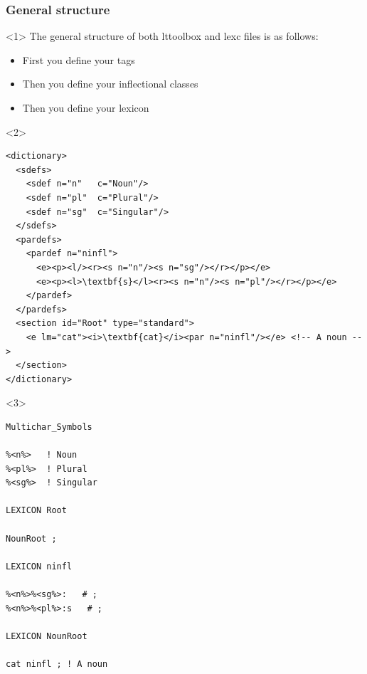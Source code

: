 \documentclass[10pt,xetex]{beamer} %
\begin{document}
\begin{frame}[fragile]
  \frametitle{General structure}

\begin{onlyenv}<1>
The general structure of both lttoolbox and lexc files is as follows:

\begin{itemize}

  \item First you define your tags

  \item Then you define your inflectional classes

  \item Then you define your lexicon

\end{itemize}
\end{onlyenv}

\begin{onlyenv}<2>
    \begin{verbatim}
<dictionary>
  <sdefs>
    <sdef n="n"   c="Noun"/>
    <sdef n="pl"  c="Plural"/>
    <sdef n="sg"  c="Singular"/>
  </sdefs>
  <pardefs>
    <pardef n="ninfl">
      <e><p><l/><r><s n="n"/><s n="sg"/></r></p></e>
      <e><p><l>\textbf{s}</l><r><s n="n"/><s n="pl"/></r></p></e>
    </pardef>
  </pardefs>
  <section id="Root" type="standard">
    <e lm="cat"><i>\textbf{cat}</i><par n="ninfl"/></e> <!-- A noun -->
  </section>
</dictionary>
    \end{verbatim}
\end{onlyenv}


\begin{onlyenv}<3>
\begin{verbatim}
Multichar_Symbols

%<n%>   ! Noun
%<pl%>  ! Plural
%<sg%>  ! Singular

LEXICON Root

NounRoot ;

LEXICON ninfl

%<n%>%<sg%>:   # ;
%<n%>%<pl%>:s   # ;

LEXICON NounRoot

cat ninfl ; ! A noun


\end{verbatim}

\end{onlyenv}
\end{frame}
\end{document}
